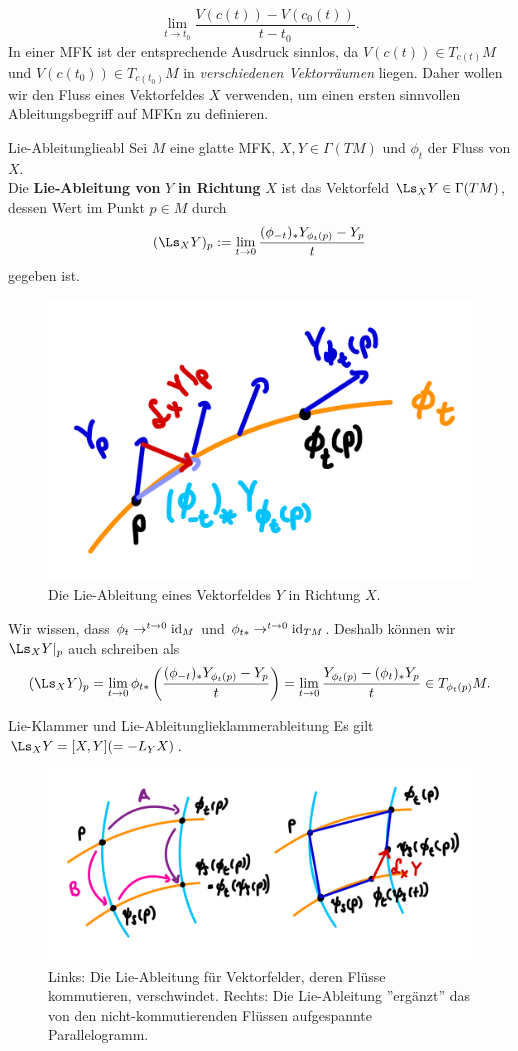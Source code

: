 \begin{equation}
\lim_{t \to t_0} \frac{V(c(t))-V(c_0(t))}{t-t_0}.
\end{equation}
In einer MFK ist der entsprechende Ausdruck sinnlos, da $V(c(t)) \in T_{c(t)}M$ und $V(c(t_0)) \in T_{c(t_0)}M$ in \textit{verschiedenen Vektorräumen} liegen. Daher wollen wir den Fluss eines Vektorfeldes $X$ verwenden, um einen ersten sinnvollen Ableitungsbegriff auf MFKn zu definieren.
\begin{definition}{Lie-Ableitung}{lieabl}
Sei $M$ eine glatte MFK, $X, Y \in \Gamma(TM)$ und $\phi_t$ der Fluss von $X$.\\
Die \textbf{Lie-Ableitung von} $Y$ \textbf{in Richtung} $X$ ist das Vektorfeld $\Ls_XY \in \Gamma(TM)$, dessen Wert im Punkt $p \in M$ durch
\begin{equation}
(\Ls_XY)_p := \lim_{t \to 0} \frac{(\phi_{-t})_\ast Y_{\phi_t(p)} - Y_p}{t}
\end{equation}
gegeben ist.
\begin{figure}[H]
\label{fig:lieabl}
\centering
\includegraphics[width=0.4\linewidth]{Bilder/lieabl.png}
\caption{Die Lie-Ableitung eines Vektorfeldes $Y$ in Richtung $X$.}
\end{figure}
\end{definition}
\begin{bemerkung}
Wir wissen, dass $\phi_t \to^{t \to 0} \text{id}_M$ und $\phi_{t\ast} \to^{t \to 0} \text{id}_{TM}$. Deshalb können wir $\Ls_XY|_p$ auch schreiben als 
\begin{equation}
(\Ls_XY)_p = \lim_{t \to 0} \phi_{t\ast} \left( \frac{(\phi_{-t})_\ast Y_{\phi_t(p)} - Y_p}{t}\right) = \lim_{t\to 0} \frac{ Y_{\phi_t(p)} - (\phi_t)_\ast Y_p}{t} \in T_{\phi_t(p)}M.
\end{equation}
\end{bemerkung}
\begin{satz}{Lie-Klammer und Lie-Ableitung}{lieklammerableitung}
Es gilt $\Ls_X Y=[X, Y] (= - L_Y X)$.
\begin{figure}[H]
\label{fig:lieablklammer}
\centering
\includegraphics[width=0.4\linewidth]{Bilder/lieablklammer.png}
\caption{Links: Die Lie-Ableitung für Vektorfelder, deren Flüsse kommutieren, verschwindet. Rechts: Die Lie-Ableitung ''ergänzt'' das von den nicht-kommutierenden Flüssen aufgespannte Parallelogramm.}
\end{figure}
\end{satz}
